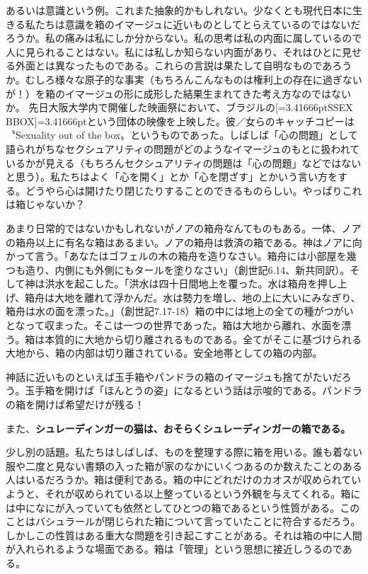 \documentclass[b5j,twoside,twocolumn]{utarticle}
\begin{document}
あるいは意識という例。これまた抽象的かもしれない。少なくとも現代日本に生きる私たちは意識を箱のイマージュに近いものとしてとらえているのではないだろうか。私の痛みは私にしか分からない。私の思考は私の内面に属しているので人に見られることはない。私には私しか知らない内面があり、それはひとに見せる外面とは異なったものである。これらの言説は果たして自明なものであろうか。むしろ様々な原子的な事実（もちろんこんなものは権利上の存在に過ぎないが！）を箱のイマージュの形に成形した結果生まれてきた考え方なのではないか。 先日大阪大学内で開催した映画祭において、ブラジルの\tbaselineshift=2.5pt[\tbaselineshift=3.41666ptSSEX BBOX\tbaselineshift=2.5pt]\tbaselineshift=3.41666ptという団体の映像を上映した。彼／女らのキャッチコピーは〝Sexuality out of the box〟というものであった。しばしば「心の問題」として語られがちなセクシュアリティの問題がどのようなイマージュのもとに扱われているかが見える（もちろんセクシュアリティの問題は「心の問題」などではないと思う）。私たちはよく「心を開く」とか「心を閉ざす」とかいう言い方をする。どうやら心は開けたり閉じたりすることのできるものらしい。やっぱりこれは箱じゃないか？


あまり日常的ではないかもしれないがノアの箱舟なんてものもある。一体、ノアの箱舟以上に有名な箱はあるまい。ノアの箱舟は救済の箱である。神はノアに向かって言う。「あなたはゴフェルの木の箱舟を造りなさい。箱舟には小部屋を幾つも造り、内側にも外側にもタールを塗りなさい」（創世記6.14、新共同訳）。そして神は洪水を起こした。「洪水は四十日間地上を覆った。水は箱舟を押し上げ、箱舟は大地を離れて浮かんだ。水は勢力を増し、地の上に大いにみなぎり、箱舟は水の面を漂った。」（創世記7.17-18）箱の中には地上の全ての種がつがいとなって収まった。そこは一つの世界であった。箱は大地から離れ、水面を漂う。箱は本質的に大地から切り離されるものである。全てがそこに基づけられる大地から、箱の内部は切り離されている。安全地帯としての箱の内部。


神話に近いものといえば玉手箱やパンドラの箱のイマージュも捨てがたいだろう。玉手箱を開けば「ほんとうの姿」になるという話は示唆的である。パンドラの箱を開けば希望だけが残る！


また、\textbf{シュレーディンガーの猫は、おそらくシュレーディンガーの箱である。}


少し別の話題。私たちはしばしば、ものを整理する際に箱を用いる。誰も着ない服や二度と見ない書類の入った箱が家のなかにいくつあるのか数えたことのある人はいるだろうか。箱は便利である。箱の中にどれだけのカオスが収められていようと、それが収められている以上整っているという外観を与えてくれる。箱には中になにが入っていても依然としてひとつの箱であるという性質がある。このことはバシュラールが閉じられた箱について言っていたことに符合するだろう。しかしこの性質はある重大な問題を引き起こすことがある。それは箱の中に人間が入れられるような場面である。箱は「管理」という思想に接近しうるのである。
\end{document}

